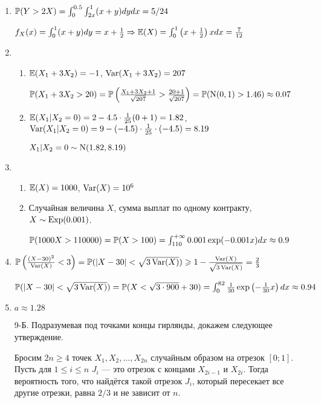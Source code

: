 \begin{enumerate}
\item
$\P(Y>2X)=\int_0^{0.5} \int_{2x}^{1} (x+y) dydx = 5/24$

$f_X(x) = \int_0^1 (x+y) dy = x + \frac{1}{2} \Rightarrow \E(X) = \int_0^1 \left(x+\frac{1}{2}\right)x dx = \frac{7}{12}$
\item
\begin{enumerate}
\item $\E(X_1 + 3X_2) = -1$, $\Var(X_1 + 3X_2) = 207$

$\P(X_1 + 3X_2 > 20) = \P\left(\frac{X_1 + 3X_2 +1}{\sqrt{207}} > \frac{20+1}{\sqrt{207}} \right) = \P(\cN(0,1)>1.46) \approx 0.07$
\item $\E(X_1|X_2 = 0) = 2 - 4.5\cdot\frac{1}{25}(0+1) = 1.82$, $\Var(X_1 | X_2 = 0) = 9 - (-4.5) \cdot \frac{1}{25} \cdot(-4.5) = 8.19$

$X_1 | X_2 = 0 \sim \cN(1.82, 8.19)$
\end{enumerate}
\item
\begin{enumerate}
\item $\E(X)=1000$, $\Var(X) = 10^6$
\item Случайная величина $X$, сумма выплат по одному контракту, $X \sim \cExp(0.001)$.

$\P(1000X>110000) = \P(X>100) = \int_{110}^{+\infty} 0.001 \exp(-0.001x) dx \approx 0.9$
\end{enumerate}
\item $\P\left(\frac{(X-30)^{2}}{\Var(X)}<3\right) = \P(|X-30|< \sqrt{3\Var(X)}) \geq 1 - \frac{\Var(X)}{ \sqrt{3\Var(X)}} = \frac{2}{3}$

$\P(|X-30|< \sqrt{3\Var(X)}) = \P(X< \sqrt{3\cdot900}+30) = \int_{0}^{82}\frac{1}{30} \exp\left(-\frac{1}{30}x\right)dx\approx 0.94$
\item $a \approx 1.28$
\item[9-Б.]
Подразумевая под точками концы гирлянды, докажем следующее утверждение.

Бросим $2n \geq 4$ точек $X_1, X_2, \ldots, X_{2n}$ случайным образом на отрезок $[0;1]$. Пусть для $1 \leq i \leq n$ $J_i$ — это отрезок с концами $X_{2i-1}$ и $X_{2i}$.
Тогда вероятность того, что найдётся такой отрезок $J_i$, который пересекает все другие отрезки, равна $2/3$ и не зависит от $n$.


\end{enumerate}
